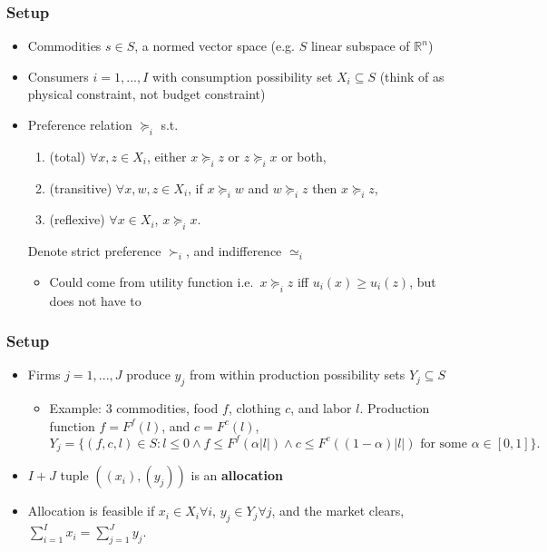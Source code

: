 \documentclass[compress]{beamer}
\def\R{\mathbb{R}}
\newcommand{\prefeq}{\succeq}
\newcommand{\pref}{\succ}
\begin{document}
\begin{frame}
  \frametitle{Setup}
  \begin{itemize}
  \item Commodities $s \in S$, a normed vector space (e.g. $S$ linear
    subspace of $\R^n$)
  \item Consumers $i=1,..., I$ with consumption possibility set $X_i
    \subseteq S$
    (think of as physical constraint, not budget constraint)
  \item Preference relation $\prefeq_i$ s.t.
    \begin{enumerate}
    \item (total) $\forall x, z \in X_i$, either $x \prefeq_i z$ or $z
      \prefeq_i x$ or both,
    \item (transitive) $\forall x, w, z \in X_i$, if $x \prefeq_i w$ and $w
      \prefeq_i z$ then $x \prefeq_i z$,
    \item (reflexive) $\forall x \in X_i$, $x \prefeq_i x$.
    \end{enumerate}
    Denote strict preference $\pref_i$, and indifference $\simeq_i$
    \begin{itemize}
    \item Could come from  utility function i.e.\ $x \prefeq_i z$ iff
      $u_i(x) \geq u_i(z)$, but does not have to
    \end{itemize}    
  \end{itemize}
\end{frame}

\begin{frame}
  \frametitle{Setup}
  \begin{itemize}
  \item Firms $j=1,...,J$ produce $y_j$ from within production
    possibility sets $Y_j \subseteq S$
    \begin{itemize}
    \item Example: 3 commodities, food $f$, clothing $c$, and labor
      $l$. Production function $f = F^f(l)$, and $c = F^c(l)$,
      \[ Y_j = \{ (f,c,l) \in S: l \leq 0 \wedge f \leq F^f(\alpha |l|)
      \wedge c \leq F^c((1-\alpha) |l|) \text{ for some } \alpha \in
      [0,1]\}. \] 
    \end{itemize}
  \item $I+J$ tuple $((x_i),(y_j))$ is an \textbf{allocation} 
  \item Allocation is feasible if $x_i \in X_i \forall i$, $y_j \in
    Y_j \forall j$, and the market clears, 
    $\sum_{i=1}^I x_i = \sum_{j=1}^J y_j$.
  \end{itemize}
\end{frame}  
\end{document}
